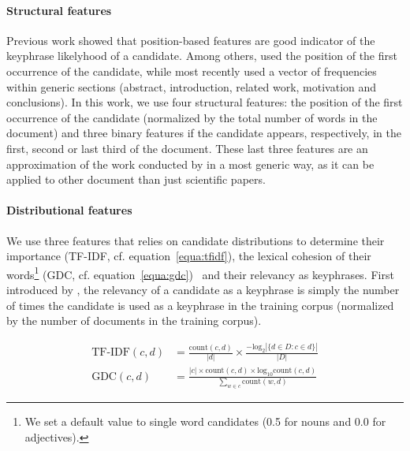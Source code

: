      \paragraph{Structural features} Previous work showed that position-based
      features are good indicator of the keyphrase likelyhood of a candidate.
      Among others,  used the position of the
      first occurrence of the candidate, while most recently
       used a vector of frequencies
      within generic sections (abstract, introduction, related work, motivation
      and conclusions). In this work, we use four structural features: the
      position of the first occurrence of the candidate (normalized by the total
      number of words in the document) and three binary features if the
      candidate appears, respectively, in the first, second or last third of the
      document. These last three features are an approximation of the work
      conducted by  in a most generic
      way, as it can be applied to other document than just scientific papers.

      \paragraph{Distributional features} We use three features that relies on
      candidate distributions to determine their importance (TF-IDF, cf.
      equation~\ref{equa:tfidf}), the lexical cohesion of their
      words\footnote{We set a default value to single word candidates (0.5 for
      nouns and 0.0 for adjectives).} (GDC, cf.
      equation~\ref{equa:gdc})~\cite{lopez2010humb} and their relevancy as
      keyphrases. First introduced by , the
      relevancy of a candidate as a keyphrase is simply the number of times the
      candidate is used as a keyphrase in the training corpus (normalized by the
      number of documents in the training corpus).

      \begin{footnotesize}
        \begin{align}
          \text{TF-IDF}(c, d) &= \frac{\text{count}(c, d)}{|d|}
          \times \frac{-\text{log}_2|\{d \in D : c \in d\}|}{|D|} \label{equa:tfidf}\\
          \text{GDC}(c, d) &= \frac{|c| \times \text{count}(c, d) \times \text{log}_{10}\text{count}(c, d)}{\sum_{w \in c}\text{count}(w, d)}\label{equa:gdc}
        \end{align}
      \end{footnotesize}


